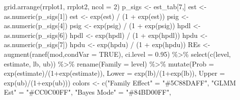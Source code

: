 \documentclass[12pt]{article}
\newenvironment{Shaded}{\begin{snugshade}}{\end{snugshade}}
\newcommand{\AttributeTok}[1]{\textcolor[rgb]{0.77,0.63,0.00}{#1}}
\newcommand{\ConstantTok}[1]{\textcolor[rgb]{0.00,0.00,0.00}{#1}}
\newcommand{\DecValTok}[1]{\textcolor[rgb]{0.00,0.00,0.81}{#1}}
\newcommand{\FloatTok}[1]{\textcolor[rgb]{0.00,0.00,0.81}{#1}}
\newcommand{\FunctionTok}[1]{\textcolor[rgb]{0.00,0.00,0.00}{#1}}
\newcommand{\NormalTok}[1]{#1}
\newcommand{\OtherTok}[1]{\textcolor[rgb]{0.56,0.35,0.01}{#1}}
\newcommand{\SpecialCharTok}[1]{\textcolor[rgb]{0.00,0.00,0.00}{#1}}
\newcommand{\StringTok}[1]{\textcolor[rgb]{0.31,0.60,0.02}{#1}}
\begin{document}
\begin{Shaded}
\begin{Highlighting}[]
\FunctionTok{grid.arrange}\NormalTok{(rrplot1, rrplot2, }\AttributeTok{ncol =} \DecValTok{2}\NormalTok{)}
\NormalTok{p\_sigs }\OtherTok{\textless{}{-}}\NormalTok{ est\_tab[}\DecValTok{7}\NormalTok{,]}
\NormalTok{est }\OtherTok{\textless{}{-}} \FunctionTok{as.numeric}\NormalTok{(p\_sigs[}\DecValTok{1}\NormalTok{])}
\NormalTok{est }\OtherTok{\textless{}{-}} \FunctionTok{exp}\NormalTok{(est) }\SpecialCharTok{/}\NormalTok{ (}\DecValTok{1} \SpecialCharTok{+} \FunctionTok{exp}\NormalTok{(est)) }
\NormalTok{psig }\OtherTok{\textless{}{-}} \FunctionTok{as.numeric}\NormalTok{(p\_sigs[}\DecValTok{4}\NormalTok{])}
\NormalTok{psig }\OtherTok{\textless{}{-}} \FunctionTok{exp}\NormalTok{(psig) }\SpecialCharTok{/}\NormalTok{ (}\DecValTok{1} \SpecialCharTok{+} \FunctionTok{exp}\NormalTok{(psig))}
\NormalTok{hpdl }\OtherTok{\textless{}{-}} \FunctionTok{as.numeric}\NormalTok{(p\_sigs[}\DecValTok{6}\NormalTok{])}
\NormalTok{hpdl }\OtherTok{\textless{}{-}} \FunctionTok{exp}\NormalTok{(hpdl) }\SpecialCharTok{/}\NormalTok{ (}\DecValTok{1} \SpecialCharTok{+} \FunctionTok{exp}\NormalTok{(hpdl))}
\NormalTok{hpdu }\OtherTok{\textless{}{-}} \FunctionTok{as.numeric}\NormalTok{(p\_sigs[}\DecValTok{7}\NormalTok{])}
\NormalTok{hpdu }\OtherTok{\textless{}{-}} \FunctionTok{exp}\NormalTok{(hpdu) }\SpecialCharTok{/}\NormalTok{ (}\DecValTok{1} \SpecialCharTok{+} \FunctionTok{exp}\NormalTok{(hpdu))}
\NormalTok{REs }\OtherTok{\textless{}{-}} \FunctionTok{augment}\NormalTok{(}\FunctionTok{ranef}\NormalTok{(mod,}\AttributeTok{condVar =} \ConstantTok{TRUE}\NormalTok{), }\AttributeTok{ci.level =} \FloatTok{0.95}\NormalTok{) }\SpecialCharTok{\%\textgreater{}\%}
  \FunctionTok{select}\NormalTok{(}\FunctionTok{c}\NormalTok{(level, estimate, lb, ub)) }\SpecialCharTok{\%\textgreater{}\%}
  \FunctionTok{rename}\NormalTok{(}\AttributeTok{Family =}\NormalTok{ level) }\SpecialCharTok{\%\textgreater{}\%}
  \FunctionTok{mutate}\NormalTok{(}\AttributeTok{Prob =} \FunctionTok{exp}\NormalTok{(estimate)}\SpecialCharTok{/}\NormalTok{(}\DecValTok{1}\SpecialCharTok{+}\FunctionTok{exp}\NormalTok{(estimate)),}
         \AttributeTok{Lower =} \FunctionTok{exp}\NormalTok{(lb)}\SpecialCharTok{/}\NormalTok{(}\DecValTok{1}\SpecialCharTok{+}\FunctionTok{exp}\NormalTok{(lb)),}
         \AttributeTok{Upper =} \FunctionTok{exp}\NormalTok{(ub)}\SpecialCharTok{/}\NormalTok{(}\DecValTok{1}\SpecialCharTok{+}\FunctionTok{exp}\NormalTok{(ub)))}
\NormalTok{colors }\OtherTok{\textless{}{-}} \FunctionTok{c}\NormalTok{(}\StringTok{"Family Effect"} \OtherTok{=} \StringTok{"\#5C88DAFF"}\NormalTok{, }\StringTok{"GLMM Est"} \OtherTok{=} \StringTok{"\#CC0C00FF"}\NormalTok{, }\StringTok{"Bayes Mode"} \OtherTok{=} \StringTok{"\#84BD00FF"}\NormalTok{,}

\end{Highlighting}
\end{Shaded}
\end{document}
